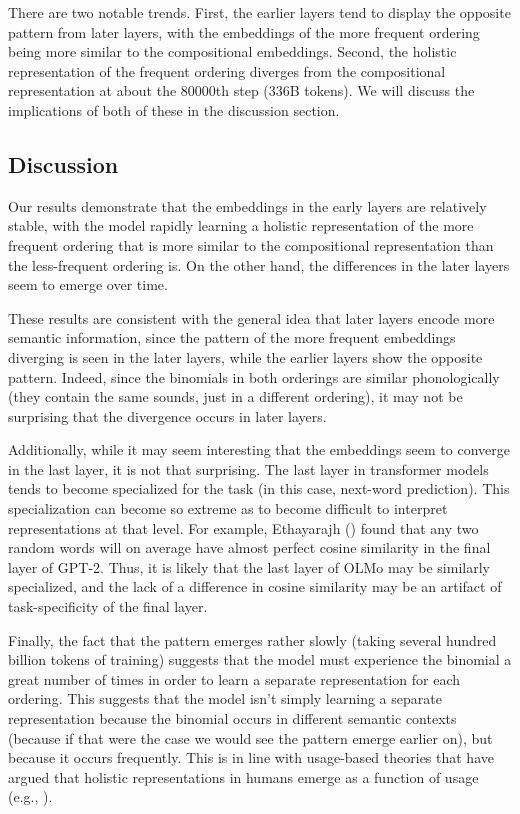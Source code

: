 \documentclass[
  12pt,
  letterpaper,
]{scrreprt}
\begin{document}
There are two notable trends. First, the earlier layers tend to display
the opposite pattern from later layers, with the embeddings of the more
frequent ordering being more similar to the compositional embeddings.
Second, the holistic representation of the frequent ordering diverges
from the compositional representation at about the 80000th step (336B
tokens). We will discuss the implications of both of these in the
discussion section.

\subsection{Discussion}\label{discussion-9}

Our results demonstrate that the embeddings in the early layers are
relatively stable, with the model rapidly learning a holistic
representation of the more frequent ordering that is more similar to the
compositional representation than the less-frequent ordering is. On the
other hand, the differences in the later layers seem to emerge over
time.

These results are consistent with the general idea that later layers
encode more semantic information, since the pattern of the more frequent
embeddings diverging is seen in the later layers, while the earlier
layers show the opposite pattern. Indeed, since the binomials in both
orderings are similar phonologically (they contain the same sounds, just
in a different ordering), it may not be surprising that the divergence
occurs in later layers.

Additionally, while it may seem interesting that the embeddings seem to
converge in the last layer, it is not that surprising. The last layer in
transformer models tends to become specialized for the task (in this
case, next-word prediction). This specialization can become so extreme
as to become difficult to interpret representations at that level. For
example, Ethayarajh
() found that any two
random words will on average have almost perfect cosine similarity in
the final layer of GPT-2. Thus, it is likely that the last layer of OLMo
may be similarly specialized, and the lack of a difference in cosine
similarity may be an artifact of task-specificity of the final layer.

Finally, the fact that the pattern emerges rather slowly (taking several
hundred billion tokens of training) suggests that the model must
experience the binomial a great number of times in order to learn a
separate representation for each ordering. This suggests that the model
isn't simply learning a separate representation because the binomial
occurs in different semantic contexts (because if that were the case we
would see the pattern emerge earlier on), but because it occurs
frequently. This is in line with usage-based theories that have argued
that holistic representations in humans emerge as a function of usage
(e.g., ).
\end{document}
